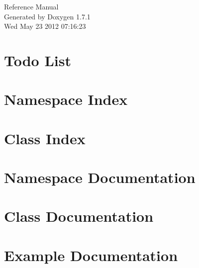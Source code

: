 \documentclass[a4paper]{book}
\begin{document}
\hypersetup{pageanchor=false}
\begin{titlepage}
\vspace*{7cm}
\begin{center}
{\Large Reference Manual}\\
\vspace*{1cm}
{\large Generated by Doxygen 1.7.1}\\
\vspace*{0.5cm}
{\small Wed May 23 2012 07:16:23}\\
\end{center}
\end{titlepage}
\clearemptydoublepage
{}
\tableofcontents
\clearemptydoublepage
{}
\hypersetup{pageanchor=true}
\chapter{Todo List}
\label{todo}
\hypertarget{todo}{}

\chapter{Namespace Index}

\chapter{Class Index}

\chapter{Namespace Documentation}




\chapter{Class Documentation}










\chapter{Example Documentation}

\printindex
\end{document}

